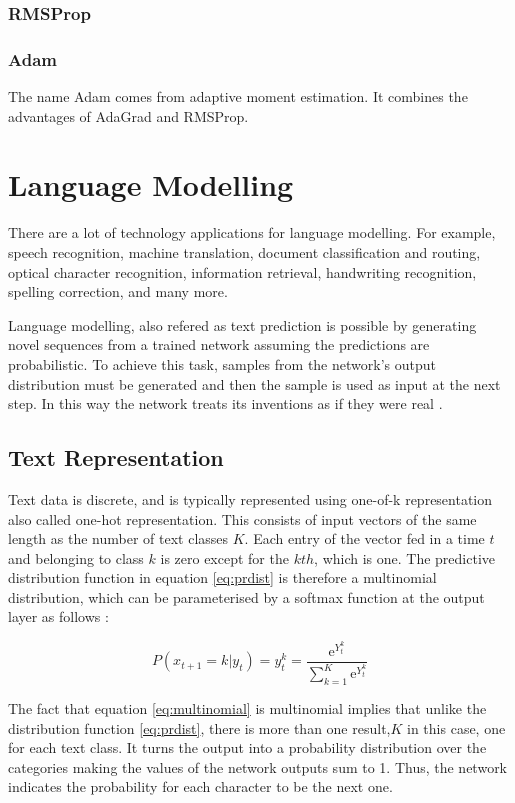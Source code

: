 \subsubsection{RMSProp}
\subsubsection{Adam}
The name Adam comes from adaptive moment estimation. It combines the advantages of AdaGrad and RMSProp. 

\section{Language Modelling}
There are a lot of technology applications for language modelling. For example, speech recognition, machine translation, document classification and routing, optical character recognition, information retrieval, handwriting recognition, spelling correction, and many more.

Language modelling, also refered as text prediction is possible by generating novel sequences from a trained network assuming the predictions are probabilistic. To achieve this task, samples from the network's output distribution must be generated and then the sample is used as input at the next step. In this way the network treats its inventions as if they were real \cite{graves2013generating}.

\subsection{Text Representation}
Text data is discrete, and is typically represented using one-of-k representation also called one-hot representation. This consists of input vectors of the same length as the number of text classes $K$. Each entry of the vector fed in a time $t$ and belonging to class $k$ is zero except for the $kth$, which is one. The predictive distribution function in equation \ref{eq:prdist} is therefore a multinomial distribution, which can be parameterised by a softmax function at the output layer as follows \cite{graves2013generating}:

\begin{equation} \label{eq:multinomial}
P(x_{t+1}=k|y_t)=y^k_t=\frac{\mathrm{e}^{Y^k_t}}{ \sum_{k=1}^{K} \mathrm{e}^{Y^k_t}}
\end{equation}

The fact that equation \ref{eq:multinomial} is multinomial implies that unlike the distribution function \ref{eq:prdist}, there is more than one result,$K$ in this case, one for each text class.  It turns the output into a probability distribution over the categories making the values of the network outputs sum to 1. Thus, the network indicates the probability for each character to be the next one.

